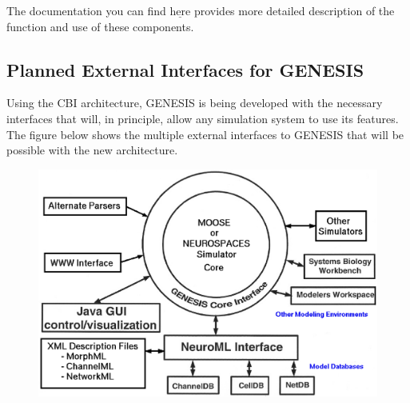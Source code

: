 \documentclass[12pt]{article}
\begin{document}
The documentation you can find $\underline{\mbox{here}}$ provides more detailed description of the function and use of these components.

\subsection*{Planned External Interfaces for GENESIS}

Using the CBI architecture, GENESIS is being developed with the necessary interfaces that will, in principle, allow any simulation system to use its features. The figure below shows the multiple external interfaces to GENESIS that will be possible with the new architecture.

\begin{figure}[h]
  \centering
 \includegraphics[scale=0.35]{figures/G3-Interfaces.eps}
  \label{fig:g3interfaces}
\end{figure}
\end{document}
